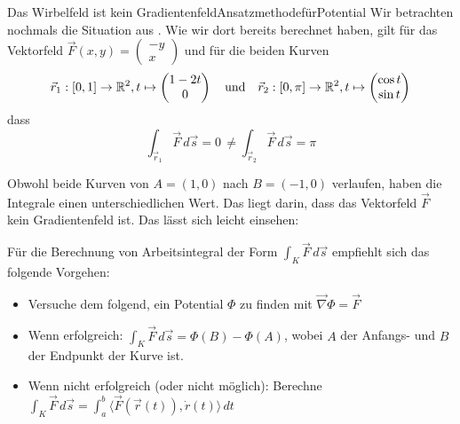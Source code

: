 \begin{bsp}
    {Das Wirbelfeld ist kein Gradientenfeld}{AnsatzmethodefürPotential}
    Wir betrachten nochmals die Situation aus . Wie wir dort bereits berechnet haben, gilt für das Vektorfeld \(\vec{F}(x,y) = \begin{pmatrix}
        -y \\x
    \end{pmatrix}\) und für die beiden Kurven
    \[\vec{r}_1 : [0,1]\to \mathbb{R}^2, t \mapsto \begin{pmatrix}
            1-2t \\ 0
        \end{pmatrix}  \quad \text{und}\quad  \vec{r}_2 : [0, \pi]\to \mathbb{R}^2, t \mapsto \begin{pmatrix}
            \cos t \\ \sin t
        \end{pmatrix}  \]
    dass
    \[ \int_{\vec{r}_1} \vec{F} \, d\vec{s} = 0 \, \neq \int_{\vec{r}_2} \vec{F} \, d\vec{s} = \pi\]

    Obwohl beide Kurven von \(A=(1,0)\) nach \(B=(-1,0)\) verlaufen, haben die Integrale einen unterschiedlichen Wert. Das liegt darin, dass das Vektorfeld \(\vec{F}\) kein Gradientenfeld ist. Das lässt sich leicht einsehen:

    \vspace*{15cm}



\end{bsp}
Für die Berechnung von Arbeitsintegral der Form \(\int_{K} \vec{F} \, d\vec{s}\) empfiehlt sich das folgende Vorgehen:
\begin{itemize}
    \item Versuche dem  folgend, ein Potential \(\Phi\) zu finden mit \(\vec{\nabla}\Phi = \vec{F}\)
    \item Wenn erfolgreich: \(\int_{K} \vec{F} \, d\vec{s} = \Phi(B)-\Phi(A)\), wobei \(A\) der Anfangs- und \(B\) der Endpunkt der Kurve ist.
    \item Wenn nicht erfolgreich (oder nicht möglich): Berechne \(\int_{K} \vec{F} \, d\vec{s} =\int_{a}^{b}\langle \vec{F}(\vec{r}(t)), \dot{r}(t) \rangle  \,  dt\)
\end{itemize}

